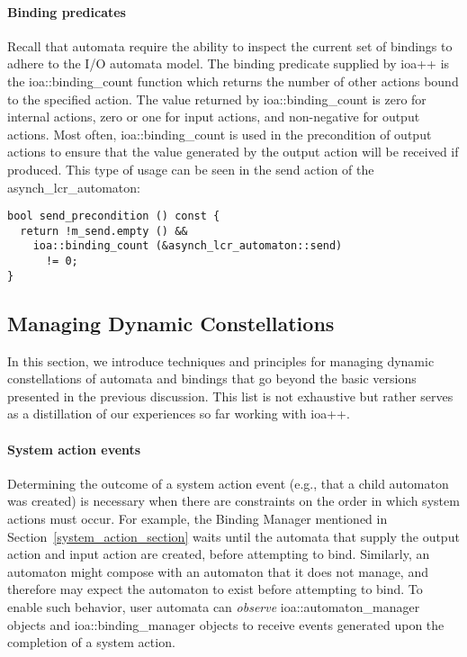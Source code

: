 \paragraph*{Binding predicates}
Recall that automata require the ability to inspect the current set of bindings to adhere to the I/O automata model.
The binding predicate supplied by ioa++ is the ioa::binding\_count function which returns the number of other actions bound to the specified action.
The value returned by ioa::binding\_count is zero for internal actions, zero or one for input actions, and non-negative for output actions.
Most often, ioa::binding\_count is used in the precondition of output actions to ensure that the value generated by the output action will be received if produced.
\ifjournal
This type of usage can be seen in the send action of the asynch\_lcr\_automaton:
\begin{lstlisting}
bool send_precondition () const {
  return !m_send.empty () &&
    ioa::binding_count (&asynch_lcr_automaton::send)
      != 0;
}
\end{lstlisting}
\fi

\subsection{Managing Dynamic Constellations\label{constellations}}

In this section, we introduce techniques and principles for managing dynamic constellations of automata and bindings that go beyond the basic versions presented in the previous discussion.
This list is not exhaustive but rather serves as a distillation of our experiences so far working with ioa++.

\paragraph*{System action events}
Determining the outcome of a system action event (e.g., that a child automaton was created) is necessary when there are constraints on the order in which system actions must occur.
For example, the Binding Manager mentioned in Section~\ref{system_action_section} waits until the automata that supply the output action and input action are created, before attempting to bind.
Similarly, an automaton might compose with an automaton that it does not manage, and therefore may expect the automaton to exist before attempting to bind.
To enable such behavior, user automata can \emph{observe} ioa::automaton\_manager objects and ioa::binding\_manager objects to receive events generated upon the completion of a system action.

